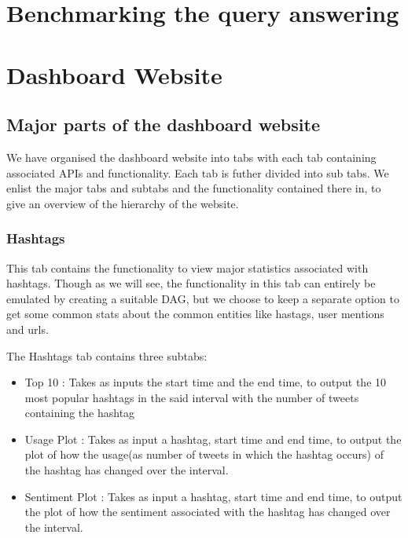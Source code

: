 \documentclass[letterpaper,10pt,english]{sphinxmanual}
\begin{document}
\chapter{Benchmarking the query answering}
\label{\detokenize{benchmarking:benchmarking-the-query-answering}}\label{\detokenize{benchmarking::doc}}

\chapter{Dashboard Website}
\label{\detokenize{dashboard_website:dashboard-website}}\label{\detokenize{dashboard_website::doc}}

\section{Major parts of the dashboard website}
\label{\detokenize{dashboard_website:major-parts-of-the-dashboard-website}}
We have organised the dashboard website into tabs with each tab containing associated APIs and functionality. Each tab is futher divided into sub tabs. We enlist the major tabs and subtabs and the functionality contained there in, to give an overview of the hierarchy of the website.


\subsection{Hashtags}
\label{\detokenize{dashboard_website:hashtags}}
This tab contains the functionality to view major statistics associated with hashtags. Though as we will see, the functionality in this tab can entirely be emulated by creating a suitable DAG, but we choose to keep a separate option to get some common stats about the common entities like hastags, user mentions and urls.

The Hashtags tab contains three subtabs:
\begin{itemize}
\item {} 
Top 10 : Takes as inputs the start time and the end time, to output the 10 most popular hashtags in the said interval with the number of tweets containing the hashtag

\item {} 
Usage Plot : Takes as input a hashtag, start time and end time, to output the plot of how the usage(as number of tweets in which the hashtag occurs) of the hashtag has changed over the interval.

\item {} 
Sentiment Plot : Takes as input a hashtag, start time and end time, to output the plot of how the sentiment associated with the hashtag has changed over the interval.

\end{itemize}
\end{document}
